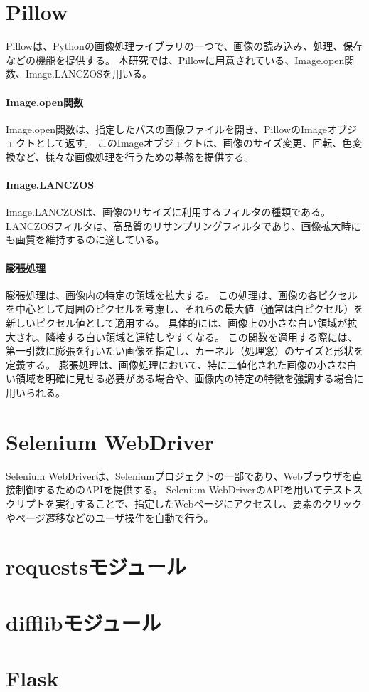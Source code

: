 \section{Pillow}\label{sec:pillow}
Pillow\cite{Pillow}は、Python\cite{Python}の画像処理ライブラリの一つで、画像の読み込み、処理、保存などの機能を提供する。
本研究では、Pillowに用意されている、Image.open関数、Image.LANCZOSを用いる。
\paragraph{Image.open関数}
Image.open関数は、指定したパスの画像ファイルを開き、PillowのImageオブジェクトとして返す。
このImageオブジェクトは、画像のサイズ変更、回転、色変換など、様々な画像処理を行うための基盤を提供する。
\paragraph{Image.LANCZOS}
Image.LANCZOSは、画像のリサイズに利用するフィルタの種類である。
LANCZOSフィルタは、高品質のリサンプリングフィルタであり、画像拡大時にも画質を維持するのに適している。

\paragraph{膨張処理}\label{sec:dilation}
膨張処理は、画像内の特定の領域を拡大する。
この処理は、画像の各ピクセルを中心として周囲のピクセルを考慮し、それらの最大値（通常は白ピクセル）を新しいピクセル値として適用する。
具体的には、画像上の小さな白い領域が拡大され、隣接する白い領域と連結しやすくなる。
この関数を適用する際には、第一引数に膨張を行いたい画像を指定し、カーネル（処理窓）のサイズと形状を定義する。
膨張処理は、画像処理において、特に二値化された画像の小さな白い領域を明確に見せる必要がある場合や、画像内の特定の特徴を強調する場合に用いられる。

\section{Selenium WebDriver}\label{sec:Selenium_WebDriver}
Selenium WebDriver\cite{Selenium WebDriver}は、Seleniumプロジェクト\cite{Selenium}の一部であり、Webブラウザを直接制御するためのAPIを提供する。
Selenium WebDriverのAPIを用いてテストスクリプトを実行することで、指定したWebページにアクセスし、要素のクリックやページ遷移などのユーザ操作を自動で行う。

\section{requestsモジュール}\label{sec:requests}

\section{difflibモジュール}\label{sec:difflib}

\section{Flask}\label{sec:Flask}